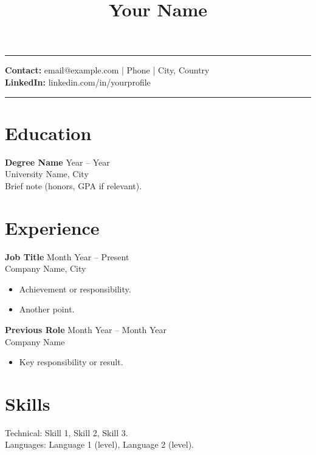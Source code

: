 \documentclass[11pt,a4paper]{article}
\title{\vspace{-1.2cm}\textbf{Your Name}}
\author{}
\date{}
\begin{document}
\maketitle
\vspace{-0.8cm}

\begin{flushright}\rule{2.2cm}{2.8cm}\end{flushright}

\textbf{Contact:} email@example.com \quad | \quad Phone \quad | \quad City, Country \\
\textbf{LinkedIn:} linkedin.com/in/yourprofile

\vspace{0.4cm}
\noindent\rule{\textwidth}{0.4pt}

\section*{Education}
\textbf{Degree Name} \hfill Year -- Year \\
University Name, City \\
Brief note (honors, GPA if relevant).

\section*{Experience}
\textbf{Job Title} \hfill Month Year -- Present \\
Company Name, City \\
\begin{itemize}
  \item Achievement or responsibility.
  \item Another point.
\end{itemize}

\textbf{Previous Role} \hfill Month Year -- Month Year \\
Company Name \\
\begin{itemize}
  \item Key responsibility or result.
\end{itemize}

\section*{Skills}
Technical: Skill 1, Skill 2, Skill 3. \\
Languages: Language 1 (level), Language 2 (level).
\end{document}
